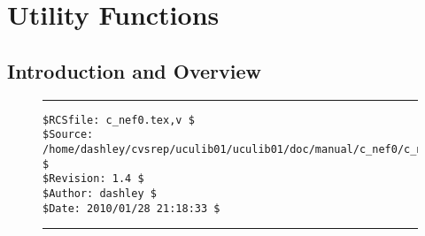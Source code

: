 
\chapter{Utility Functions}

\label{cnef0}

\section{Introduction and Overview}
\label{cnef0:siov0}



\noindent\begin{figure}[!b]
\noindent\rule[-0.25in]{\textwidth}{1pt}
\begin{tiny}
\begin{verbatim}
$RCSfile: c_nef0.tex,v $
$Source: /home/dashley/cvsrep/uculib01/uculib01/doc/manual/c_nef0/c_nef0.tex,v $
$Revision: 1.4 $
$Author: dashley $
$Date: 2010/01/28 21:18:33 $
\end{verbatim}
\end{tiny}
\noindent\rule[0.25in]{\textwidth}{1pt}
\end{figure}

%
%
%
%

